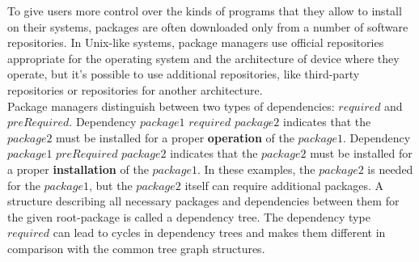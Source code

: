 To give users more control over the kinds of programs that they allow to install on their systems, packages are often downloaded only from a number of software repositories.
In Unix-like systems, package managers use official repositories appropriate for the operating system and the architecture  of device where they operate, but it's possible to use additional repositories, like third-party repositories or repositories for another architecture.\\
Package managers distinguish between two types of dependencies: $required$ and $preRequired$. %
Dependency $package1$ \textbf{$required$} $package2$ indicates that the $package2$ must be installed for a proper \textbf{operation} of the $package1$. %
Dependency $package1$ \textbf{$preRequired$} $package2$ indicates that the $package2$ must be installed for a proper \textbf{installation} of the $package1$. %
In these examples, the $package2$ is needed for the $package1$, but the $package2$ itself can require additional packages.
A structure describing all necessary packages and dependencies between them for the given root-package is called a dependency tree. 
The dependency type $required$ can lead to cycles in dependency trees and makes them different in comparison with the common tree graph structures.
